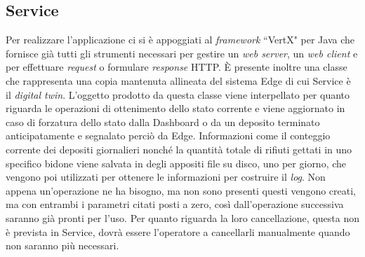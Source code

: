\documentclass[a4paper, 12pt]{report}
\begin{document}
			\subsection{Service}
			Per realizzare l'applicazione ci si è appoggiati al \textit{framework} ``VertX" per Java
			che fornisce già tutti gli strumenti necessari per gestire un \textit{web server}, un
			\textit{web client} e per effettuare \textit{request} o formulare \textit{response} HTTP.
			È presente inoltre una classe che rappresenta una copia mantenuta allineata del sistema
			Edge di cui Service è il \textit{digital twin}. L'oggetto prodotto da questa classe viene
			interpellato per quanto riguarda le operazioni di ottenimento dello stato corrente e viene
			aggiornato in caso di forzatura dello stato dalla Dashboard o da un deposito terminato
			anticipatamente e segnalato perciò da Edge. Informazioni come il conteggio corrente dei
			depositi giornalieri nonché la quantità totale di rifiuti gettati in uno specifico bidone
			viene salvata in degli appositi file su disco, uno per giorno, che vengono poi utilizzati
			per ottenere le informazioni per costruire il \textit{log}. Non appena un'operazione ne ha
			bisogno, ma non sono presenti questi vengono creati, ma con entrambi i parametri citati
			posti a zero, così dall'operazione successiva saranno già pronti per l'uso. Per quanto
			riguarda la loro cancellazione, questa non è prevista in Service, dovrà essere l'operatore
			a cancellarli manualmente quando non saranno più necessari.
\end{document}
